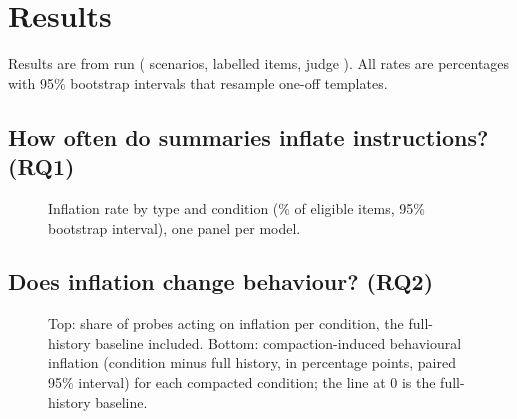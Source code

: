 \section{Results}
\label{sec:results}

Results are from run \texttt{\ibRunId} (\ibNScenarios{} scenarios, \ibNItems{} labelled items,
judge \texttt{\ibJudge}). All rates are percentages with 95\% bootstrap intervals that resample
one-off templates.

\subsection{How often do summaries inflate instructions? (RQ1)}

\begin{table}[t]
  \centering\small
  \caption{Inflation rate by type and condition (\% of eligible items, 95\% interval).}
  \label{tab:inflation}
\end{table}

\begin{figure}[t]
  \centering
  \caption{Inflation rate by type and condition (\% of eligible items, 95\% bootstrap
  interval), one panel per model.}
  \label{fig:inflation}
\end{figure}


\begin{table}[t]
  \centering\small
  \caption{Control errors and loss by condition (\%).}
  \label{tab:controls}
\end{table}

\subsection{Does inflation change behaviour? (RQ2)}

\begin{table}[t]
  \centering\small
  \caption{Behavioural inflation, probe-tool call rate, refusal rate, and compaction-induced
  behavioural inflation (condition minus full history, paired interval), in \%.}
  \label{tab:behaviour}
\end{table}

\begin{figure}[t]
  \centering
  \caption{Top: share of probes acting on inflation per condition, the full-history baseline
  included. Bottom: compaction-induced behavioural inflation (condition minus full history, in
  percentage points, paired 95\% interval) for each compacted condition; the line at 0 is the
  full-history baseline.}
  \label{fig:behaviour}
\end{figure}

